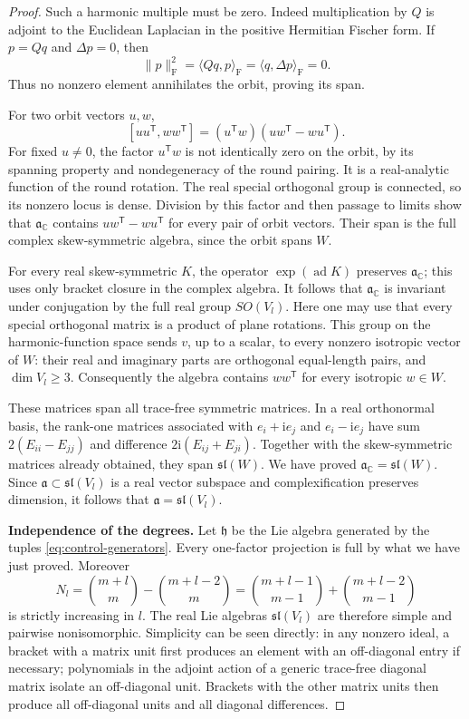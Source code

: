 \begin{proof}
Such a harmonic multiple must be zero.  Indeed multiplication by
\(Q\) is adjoint to the Euclidean Laplacian in the
positive Hermitian Fischer form.  If
\(p=Qq\) and \(\Delta p=0\), then
\[
 \|p\|_{\mathrm F}^2
   =\langle Qq,p\rangle_{\mathrm F}
   =\langle q,\Delta p\rangle_{\mathrm F}=0.
\]
Thus no nonzero element annihilates the orbit, proving its span.

For two orbit vectors \(u,w\),
\[
 [uu^{\mathsf T},ww^{\mathsf T}]
  =(u^{\mathsf T}w)
        (uw^{\mathsf T}-wu^{\mathsf T}).
\]
For fixed \(u\ne0\), the factor \(u^{\mathsf T}w\) is not
identically zero on the orbit, by its spanning property and
nondegeneracy of the round pairing.  It is a real-analytic function
of the round rotation.  The real special orthogonal group is
connected, so its nonzero locus is dense.  Division by this factor
and then passage to limits show that
\(\mathfrak a_{\mathbb C}\) contains
\(uw^{\mathsf T}-wu^{\mathsf T}\) for every pair of orbit vectors.
Their span is the full complex skew-symmetric algebra, since the
orbit spans \(W\).

For every real skew-symmetric \(K\), the operator
\(\exp(\operatorname{ad}K)\) preserves \(\mathfrak a_{\mathbb C}\);
this uses only bracket closure in the complex algebra.
It follows that
\(\mathfrak a_{\mathbb C}\) is invariant under conjugation by the
full real group \(SO(V_l)\).  Here one may use that every special
orthogonal matrix is a product of plane rotations.  This group on
the harmonic-function space sends \(v\), up to a scalar, to every
nonzero isotropic vector of \(W\): their real and imaginary parts
are orthogonal equal-length pairs, and \(\dim V_l\geq3\).
Consequently the algebra contains \(ww^{\mathsf T}\) for every
isotropic \(w\in W\).

These matrices span all trace-free symmetric matrices.  In a real
orthonormal basis, the rank-one matrices associated with
\(e_i+\mathrm i e_j\) and \(e_i-\mathrm i e_j\) have sum
\(2(E_{ii}-E_{jj})\) and difference
\(2\mathrm i(E_{ij}+E_{ji})\).  Together with the skew-symmetric
matrices already obtained, they span \(\mathfrak{sl}(W)\).
We have proved
\(\mathfrak a_{\mathbb C}=\mathfrak{sl}(W)\).
Since \(\mathfrak a\subset\mathfrak{sl}(V_l)\) is a real vector
subspace and complexification preserves dimension, it follows
that \(\mathfrak a=\mathfrak{sl}(V_l)\).

\medskip
\noindent\textbf{Independence of the degrees.}
Let \(\mathfrak h\) be the Lie algebra generated by the tuples
\eqref{eq:control-generators}.  Every one-factor projection is full
by what we have just proved.  Moreover
\[
 N_l=\binom{m+l}{m}-\binom{m+l-2}{m}
     =\binom{m+l-1}{m-1}+\binom{m+l-2}{m-1}
\]
is strictly increasing in \(l\).  The real Lie algebras
\(\mathfrak{sl}(V_l)\) are therefore simple and pairwise
nonisomorphic.  Simplicity can be seen directly: in any nonzero
ideal, a bracket with a matrix unit first produces an element with
an off-diagonal entry if necessary; polynomials in the adjoint
action of a generic trace-free diagonal matrix isolate an
off-diagonal unit.  Brackets with the other matrix units then
produce all off-diagonal units and all diagonal differences.


\end{proof}

